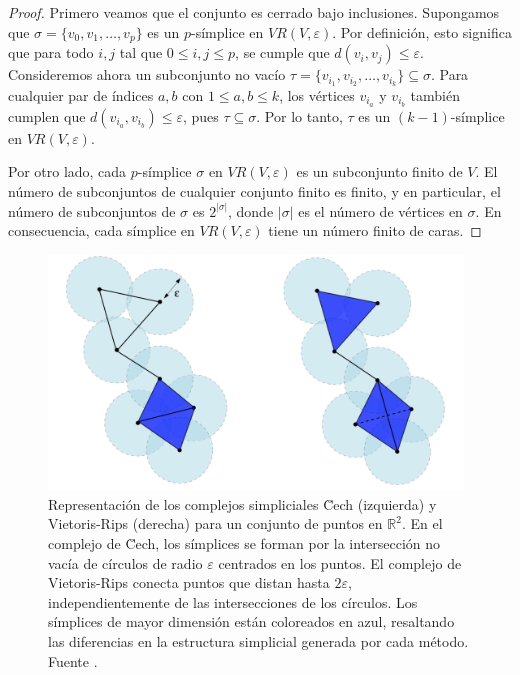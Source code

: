 \begin{proof}
	Primero veamos que el conjunto es cerrado bajo inclusiones. Supongamos que $\sigma = \{v_0, v_1, \dots, v_p\}$ es un $p$-símplice en $VR(V, \varepsilon)$. Por definición, esto significa que para todo $i, j$ tal que $0 \leq i, j \leq p$, se cumple que $d(v_i, v_j) \leq \varepsilon$. Consideremos ahora un subconjunto no vacío $\tau = \{v_{i_1}, v_{i_2}, \dots, v_{i_k}\} \subseteq \sigma$. Para cualquier par de índices $a, b$ con $1 \leq a, b \leq k$, los vértices $v_{i_a}$ y $v_{i_b}$ también cumplen que $d(v_{i_a}, v_{i_b}) \leq \varepsilon$, pues $\tau \subseteq \sigma$. Por lo tanto, $\tau$ es un $(k-1)$-símplice en $VR(V, \varepsilon)$.
	
	Por otro lado, cada $p$-símplice $\sigma$ en $VR(V, \varepsilon)$ es un subconjunto finito de $V$. El número de subconjuntos de cualquier conjunto finito es finito, y en particular, el número de subconjuntos de $\sigma$ es $2^{|\sigma|}$, donde $|\sigma|$ es el número de vértices en $\sigma$. En consecuencia, cada símplice en $VR(V, \varepsilon)$ tiene un número finito de caras.
\end{proof}

\begin{figure}
	\centering
	\includegraphics[width=110mm]{img/cech-vr.png}
	\caption{Representación de los complejos simpliciales \u Cech (izquierda) y Vietoris-Rips (derecha) para un conjunto de puntos en \( \mathbb{R}^2 \). En el complejo de \u Cech, los símplices se forman por la intersección no vacía de círculos de radio \(\varepsilon\) centrados en los puntos. El complejo de Vietoris-Rips conecta puntos que distan hasta \(2\varepsilon\), independientemente de las intersecciones de los círculos. Los símplices de mayor dimensión están coloreados en azul, resaltando las diferencias en la estructura simplicial generada por cada método. Fuente \cite{chazal2021introduction}.}
\end{figure}

